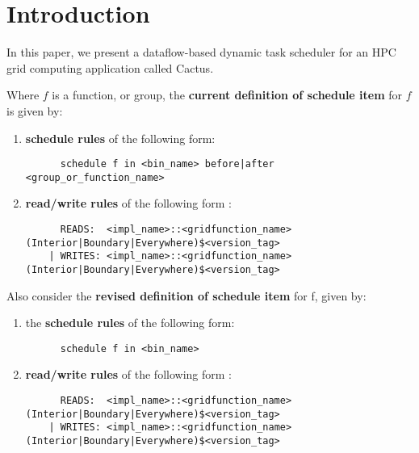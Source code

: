 
\section{Introduction}

In this paper, we present a dataflow-based dynamic task scheduler for an HPC 
grid computing application called Cactus.



\begin{framed}
Where $f$ is a function, or group, the \textbf{current definition of schedule
item} for $f$ is given by:

  \begin{enumerate}[(1)]

  \item \textbf{schedule rules} of the following form: 

      \footnotesize
      \begin{verbatim}
      schedule f in <bin_name> before|after <group_or_function_name>
      \end{verbatim}
      \normalsize

  \item \textbf{read/write rules} of the following form :

      \footnotesize
      \begin{verbatim}
      READS:  <impl_name>::<gridfunction_name>(Interior|Boundary|Everywhere)$<version_tag>
    | WRITES: <impl_name>::<gridfunction_name>(Interior|Boundary|Everywhere)$<version_tag>
      \end{verbatim}
      \normalsize

  \end{enumerate}
\end{framed}

\begin{framed}
Also consider the \textbf{revised definition of schedule item} for f, given by:

  \begin{enumerate}[(1)]

  \item the \textbf{schedule rules} of the following form:

      \footnotesize
      \begin{verbatim}
      schedule f in <bin_name>
      \end{verbatim}
      \normalsize

  \item \textbf{read/write rules} of the following form :

      \footnotesize
      \begin{verbatim}
      READS:  <impl_name>::<gridfunction_name>(Interior|Boundary|Everywhere)$<version_tag>
    | WRITES: <impl_name>::<gridfunction_name>(Interior|Boundary|Everywhere)$<version_tag>
      \end{verbatim}
      \normalsize

  \end{enumerate}
\end{framed}

